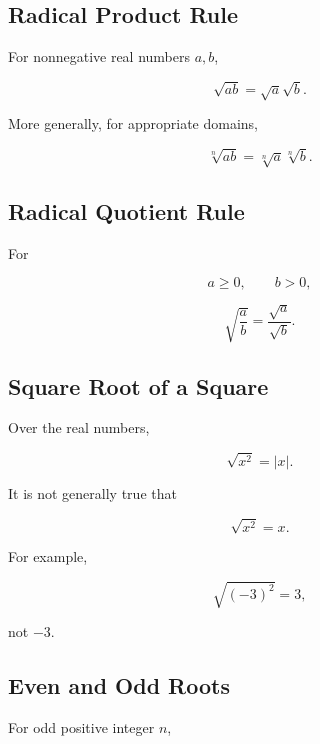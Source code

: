 \subsection{Radical Product Rule}
\label{subsec:radical-product-rule}

For nonnegative real numbers \(a,b\),

\[
\boxed{
\sqrt{ab}
=
\sqrt{a}\sqrt{b}.
}
\]

More generally, for appropriate domains,

\[
\boxed{
\sqrt[n]{ab}
=
\sqrt[n]{a}
\sqrt[n]{b}.
}
\]

\subsection{Radical Quotient Rule}
\label{subsec:radical-quotient-rule}

For

\[
a\geq0,
\qquad
b>0,
\]

\[
\boxed{
\sqrt{
\frac{a}{b}
}
=
\frac{\sqrt a}{\sqrt b}.
}
\]

\subsection{Square Root of a Square}
\label{subsec:square-root-square}

Over the real numbers,

\[
\boxed{
\sqrt{x^2}
=
|x|.
}
\]

It is not generally true that

\[
\sqrt{x^2}=x.
\]

For example,

\[
\sqrt{(-3)^2}
=
3,
\]

not \(-3\).

\subsection{Even and Odd Roots}
\label{subsec:even-odd-roots}

For odd positive integer \(n\),

